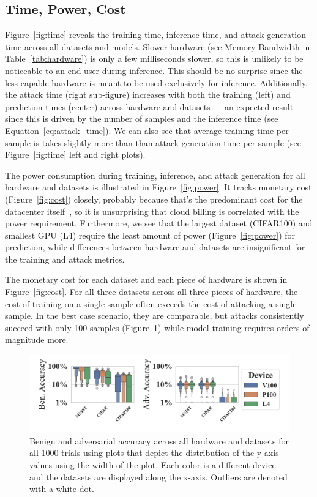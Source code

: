 \documentclass[sn-mathphys-num]{sn-jnl}%
\begin{document}
\subsection{Time, Power, Cost}
\label{res:cost}

Figure~\ref{fig:time} reveals the training time, inference time, and attack generation time across all datasets and models. Slower hardware (see Memory Bandwidth in Table~\ref{tab:hardware}) is only a few milliseconds slower, so this is unlikely to be noticeable to an end-user during inference. This should be no surprise since the less-capable hardware is meant to be used exclusively for inference. Additionally, the attack time (right sub-figure) increases with both the training (left) and prediction times (center) across hardware and datasets --- an expected result since this is driven by the number of samples and the inference time (see Equation~\ref{eq:attack_time}). We can also see that average training time per sample is takes slightly more than than attack generation time per sample (see Figure~\ref{fig:time} left and right plots).

The power consumption during training, inference, and attack generation for all hardware and datasets is illustrated in Figure~\ref{fig:power}. It tracks monetary cost (Figure~\ref{fig:cost}) closely, probably because that's the predominant cost for the datacenter itself~\cite{dayarathna2015data}, so it is unsurprising that cloud billing is correlated with the power requirement. Furthermore, we see that the largest dataset (CIFAR100) and smallest GPU (L4) require the least amount of power (Figure~\ref{fig:power}) for prediction, while differences between hardware and datasets are insignificant for the training and attack metrics. 

The monetary cost for each dataset and each piece of hardware is shown in Figure~\ref{fig:cost}. For all three datasets across all three pieces of hardware, the cost of training on a single sample often exceeds the cost of attacking a single sample. In the best case scenario, they are comparable, but attacks consistently succeed with only 100 samples (Figure~\ref{fig:acc}) while model training requires orders of magnitude more. 
\begin{figure}[tph!]
    \centering
    \includegraphics[width=\textwidth]{plots/combined/acc.pdf}
    \caption{Benign and adversarial accuracy across all hardware and datasets for all 1000 trials using plots that depict the distribution of the y-axis values using the width of the plot. Each color is a different device and the datasets are displayed along the x-axis. Outliers are denoted with a white dot.}
    \label{fig:acc}
\end{figure}
\end{document}
